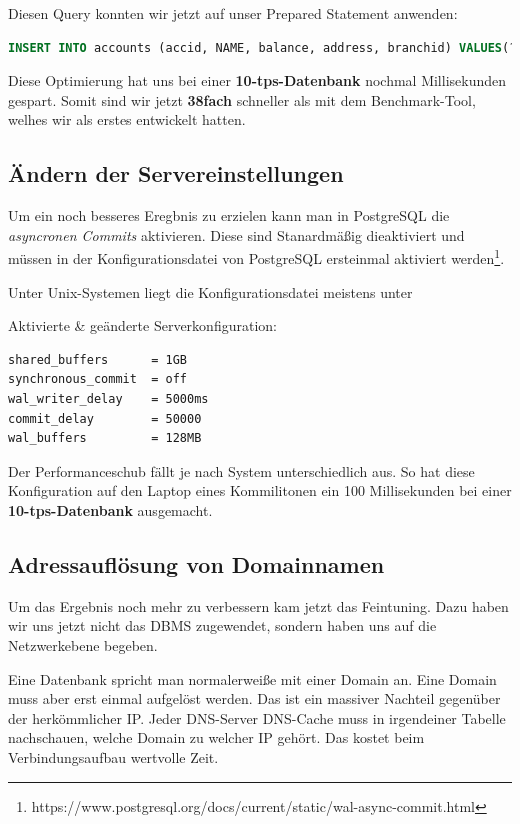 Diesen Query konnten wir jetzt auf unser Prepared Statement anwenden:
\begin{lstlisting}[language=sql]
INSERT INTO accounts (accid, NAME, balance, address, branchid) VALUES(?, 'account', 0,'test', trunc(random() * n + 1))
\end{lstlisting}

Diese Optimierung  hat uns bei einer \textbf{10-tps-Datenbank} nochmal  Millisekunden gespart. Somit sind wir jetzt \textbf{38fach} schneller 
als mit dem Benchmark-Tool, welhes wir als erstes entwickelt hatten.


\subsection{Ändern der Servereinstellungen}

Um ein noch besseres Eregbnis zu erzielen kann man in PostgreSQL die
\textit{asyncronen Commits} aktivieren. Diese sind Stanardmäßig dieaktiviert und
müssen in der Konfigurationsdatei von PostgreSQL ersteinmal aktiviert werden\footnote{https://www.postgresql.org/docs/current/static/wal-async-commit.html}.

Unter Unix-Systemen liegt die Konfigurationsdatei meistens unter \newline
{}

Aktivierte \& geänderte Serverkonfiguration:
\begin{lstlisting}
shared_buffers		= 1GB
synchronous_commit	= off
wal_writer_delay	= 5000ms
commit_delay		= 50000
wal_buffers			= 128MB
\end{lstlisting}

Der Performanceschub fällt je nach System unterschiedlich aus. So hat diese
Konfiguration auf den Laptop eines Kommilitonen ein 100 Millisekunden bei einer
\textbf{10-tps-Datenbank} ausgemacht.

\subsection{Adressauflösung von Domainnamen}
Um das Ergebnis noch mehr zu verbessern kam jetzt das Feintuning. Dazu
haben wir uns jetzt nicht das DBMS zugewendet, sondern haben uns auf die
Netzwerkebene begeben.

Eine Datenbank spricht man normalerweiße mit einer Domain an. 
Eine Domain muss aber erst einmal aufgelöst werden.
Das ist ein massiver Nachteil gegenüber der herkömmlicher IP. Jeder
DNS-Server \bzw DNS-Cache muss in irgendeiner Tabelle nachschauen, welche Domain
zu welcher IP gehört. Das kostet beim Verbindungsaufbau wertvolle Zeit.

